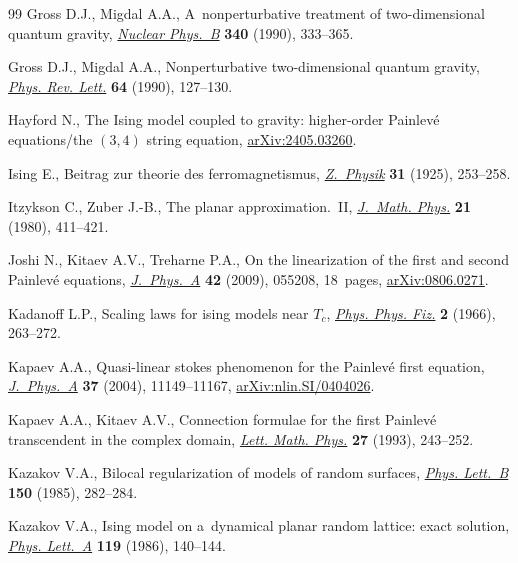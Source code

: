 \documentclass[10pt,a4paper]{amsart}
\numberwithin{equation}{section}
\begin{document}
\begin{thebibliography}{99}
Gross D.J., Migdal A.A., A~nonperturbative treatment of two-dimensional quantum
 gravity, \href{https://doi.org/10.1016/0550-3213(90)90450-R}{\textit{Nuclear
 Phys.~B}} \textbf{340} (1990), 333--365.

Gross D.J., Migdal A.A., Nonperturbative two-dimensional quantum gravity,
 \href{https://doi.org/10.1103/PhysRevLett.64.127}{\textit{Phys. Rev. Lett.}}
 \textbf{64} (1990), 127--130.

Hayford N., The {I}sing model coupled to gravity: higher-order {P}ainlev\'e
 equations/the $(3,4)$ string equation,
 \href{http://arxiv.org/abs/2405.03260}{arXiv:2405.03260}.

Ising E., Beitrag zur theorie des ferromagnetismus,
 \href{https://doi.org/10.1007/BF02980577}{\textit{Z.~Physik}} \textbf{31}
 (1925), 253--258.

Itzykson C., Zuber J.-B., The planar approximation.~{II},
 \href{https://doi.org/10.1063/1.524438}{\textit{J.~Math. Phys.}} \textbf{21}
 (1980), 411--421.

Joshi N., Kitaev A.V., Treharne P.A., On the linearization of the first and
 second {P}ainlev\'e equations,
 \href{https://doi.org/10.1088/1751-8113/42/5/055208}{\textit{J.~Phys.~A}}
 \textbf{42} (2009), 055208, 18~pages, \href{http://arxiv.org/abs/0806.0271}{arXiv:0806.0271}.

Kadanoff L.P., Scaling laws for ising models near {${T}_c$},
 \href{https://doi.org/10.1103/PhysicsPhysiqueFizika.2.263}{\textit{Phys.
 Phys. Fiz.}} \textbf{2} (1966), 263--272.

Kapaev A.A., Quasi-linear stokes phenomenon for the {P}ainlev\'e first
 equation,
 \href{https://doi.org/10.1088/0305-4470/37/46/005}{\textit{J.~Phys.~A}}
 \textbf{37} (2004), 11149--11167, \href{http://arxiv.org/abs/nlin.SI/0404026}{arXiv:nlin.SI/0404026}.

Kapaev A.A., Kitaev A.V., Connection formulae for the first {P}ainlev\'e
 transcendent in the complex domain,
 \href{https://doi.org/10.1007/BF00777371}{\textit{Lett. Math. Phys.}}
 \textbf{27} (1993), 243--252.

Kazakov V.A., Bilocal regularization of models of random surfaces,
 \href{https://doi.org/10.1016/0370-2693(85)91011-1}{\textit{Phys. Lett.~B}}
 \textbf{150} (1985), 282--284.

Kazakov V.A., Ising model on a~dynamical planar random lattice: exact solution,
 \href{https://doi.org/10.1016/0375-9601(86)90433-0}{\textit{Phys. Lett.~A}}
 \textbf{119} (1986), 140--144.


\end{thebibliography}
\end{document}
